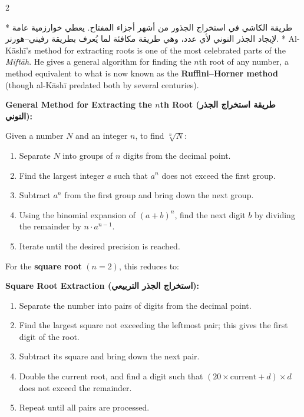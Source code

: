 \documentclass[11pt,a4paper]{article}
\newcommand{\ar}[1]{\arabicfont\beginR #1\endR}
\newenvironment{bilingual}{%
  \vspace{0.3em}%
  \begin{paracol}{2}%
}{%
  \end{paracol}%
  \vspace{0.3em}%
}
\newenvironment{mathalgo}{%
  \par\vspace{0.3cm}
  \begin{framed}
  \setlength{\parindent}{0pt}
}{%
  \end{framed}
  \par\vspace{0.3cm}
}
\begin{document}
\begin{bilingual}
\switchcolumn[0]*
\ar{طريقة الكاشي في استخراج الجذور من أشهر أجزاء المفتاح. يعطي خوارزمية عامة لإيجاد الجذر النوني لأي عدد، وهي طريقة مكافئة لما يُعرف بطريقة رفيني--هورنر.}
\switchcolumn[1]*
Al-K\=ash\=i's method for extracting roots is one of the most celebrated
parts of the \textit{Mift\=ah}. He gives a general algorithm for finding
the $n$th root of any number, a method equivalent to what is now known
as the \textbf{Ruffini--Horner method} (though al-K\=ash\=i predated both by
several centuries).
\end{bilingual}

\begin{mathalgo}
\textbf{General Method for Extracting the $n$th Root (\ar{طريقة استخراج الجذر النوني}):}

Given a number $N$ and an integer $n$, to find $\sqrt[n]{N}$:
\begin{enumerate}[nosep]
  \item Separate $N$ into groups of $n$ digits from the decimal point.
  \item Find the largest integer $a$ such that $a^n$ does not exceed the
  first group.
  \item Subtract $a^n$ from the first group and bring down the next
  group.
  \item Using the binomial expansion of $(a + b)^n$, find the next digit
  $b$ by dividing the remainder by $n \cdot a^{n-1}$.
  \item Iterate until the desired precision is reached.
\end{enumerate}
\end{mathalgo}

\noindent For the \textbf{square root} $(n=2)$, this reduces to:

\begin{mathalgo}
\textbf{Square Root Extraction (\ar{استخراج الجذر التربيعي}):}
\begin{enumerate}[nosep]
  \item Separate the number into pairs of digits from the decimal point.
  \item Find the largest square not exceeding the leftmost pair; this
  gives the first digit of the root.
  \item Subtract its square and bring down the next pair.
  \item Double the current root, and find a digit such that
  $(20 \times \text{current} + d) \times d$ does not exceed the remainder.
  \item Repeat until all pairs are processed.
\end{enumerate}
\end{mathalgo}
\end{document}

